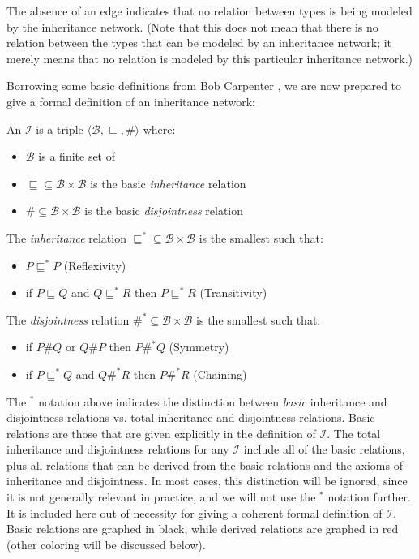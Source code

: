 The absence of an edge indicates that no relation between types is being modeled by the inheritance network. (Note that this does not mean that there is no relation between the types that can be modeled by an inheritance network; it merely means that no relation is modeled by this particular inheritance network.)

Borrowing some basic definitions from Bob Carpenter \cite{carpenter_inclusion_1991}, we are now prepared to give a formal definition of an inheritance network:
\par\vspace{5mm}
 An  $\mathcal{I}$ is a triple $\langle\mathcal{B},\sqsubseteq,\#\rangle$ where:
\begin{itemize}
\item $\mathcal{B}$ is a finite set of 
\item $\sqsubseteq\subseteq\mathcal{B}\times\mathcal{B}$ is the basic \emph{inheritance} relation
\item $\#\subseteq\mathcal{B}\times\mathcal{B}$ is the basic \emph{disjointness} relation
\end{itemize}
\par\vspace{5mm}
 The \emph{inheritance} relation $\sqsubseteq^*\subseteq\mathcal{B}\times\mathcal{B}$ is the smallest such that:
\begin{itemize}
\item $P\sqsubseteq^*P$  (Reflexivity)
\item if $P\sqsubseteq Q$ and $Q\sqsubseteq^*R$ then $P\sqsubseteq^*R$ (Transitivity)
\end{itemize}
The \emph{disjointness} relation $\#^*\subseteq\mathcal{B}\times\mathcal{B}$ is the smallest such that:
\begin{itemize}
\item if $P\#Q$ or $Q\#P$ then $P\#^*Q$ (Symmetry)
\item if $P\sqsubseteq^*Q$ and $Q\#^*R$ then $P\#^*R$ (Chaining)
\end{itemize}

The $^*$ notation above indicates the distinction between \emph{basic} inheritance and disjointness relations vs. total inheritance and disjointness relations. Basic relations are those that are given explicitly in the definition of $\mathcal{I}$. The total inheritance and disjointness relations for any $\mathcal{I}$ include all of the basic relations, plus all relations that can be derived from the basic relations and the axioms of inheritance and disjointness. In most cases, this distinction will be ignored, since it is not generally relevant in practice, and we will not use the $^*$ notation further. It is included here out of necessity for giving a coherent formal definition of $\mathcal{I}$. Basic relations are graphed in black, while derived relations are graphed in red (other coloring will be discussed below).

